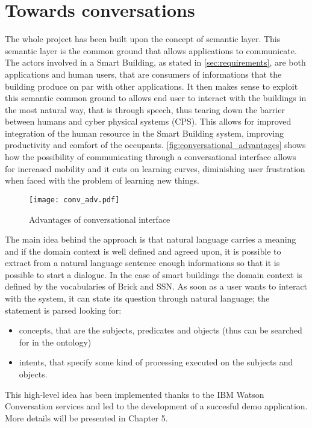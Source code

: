 \section{Towards conversations}\label{sec:conversational_interface}
The whole project has been built upon the concept of semantic layer. This semantic layer is the common ground that allows applications to communicate. The actors involved in a Smart Building, as stated in \autoref{sec:requirements}, are both applications and human users, that are consumers of informations that the building produce on par with other applications. It then makes sense to exploit this semantic common ground to allows end user to interact with the buildings in the most natural way, that is through speech, thus tearing down the barrier between humans and cyber physical systems (CPS). This allows for improved integration of the human resource in the Smart Building system, improving productivity and comfort of the occupants. \autoref{fig:conversational_advantages} shows how the possibility of communicating through a conversational interface allows for increased mobility and it cuts on learning curves, diminishing user frustration when faced with the problem of learning new things.
\begin{figure}
  \centering
  \texttt{[image: conv\_adv.pdf]}
  \caption{Advantages of conversational interface}
  \label{fig:conversational_advantages}
\end{figure}
The main idea behind the approach is that natural language carries a meaning and if the domain context is well defined and agreed upon, it is possible to extract from a natural language sentence enough informations so that it is possible to start a dialogue. In the case of smart buildings the domain context is defined by the vocabularies of Brick and SSN. As soon as a user wants to interact with the system, it can state its question through natural language; the statement is parsed looking for:
\begin{itemize}
  \item concepts, that are the subjects, predicates and objects (thus can be searched for in the ontology)
  \item intents, that specify some kind of processing executed on the subjects and objects.
\end{itemize}
This high-level idea has been implemented thanks to the IBM Watson Conversation services and led to the development of a succesful demo application. More details will be presented in Chapter 5.
